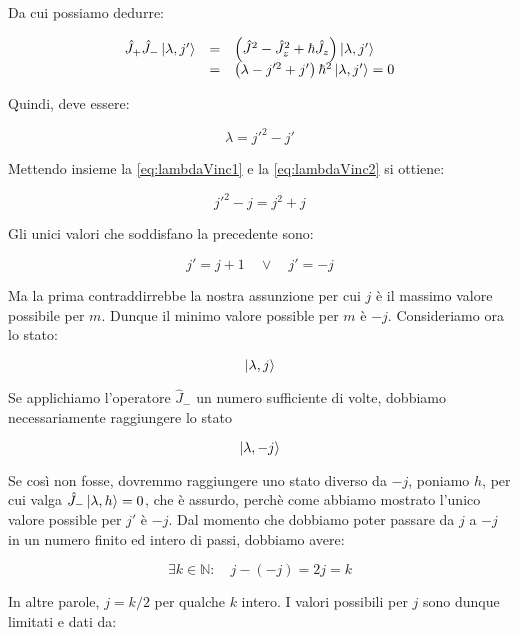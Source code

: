 Da cui possiamo dedurre:

	\begin{equation}
		\begin{array}{c c l}
			\hat{J}_+ \hat{J}_- \ket{\lambda, j'} & = & \left ( \hat{J}^2 - \hat{J}_z^2 + \hbar \hat{J}_z \right ) \ket{\lambda, j'}\\

		& = & \left ( \lambda - j'^2 + j' \right ) \hbar^2 \ket{\lambda, j'} = 0
		\end{array}
	\end{equation}

Quindi, deve essere:

	\begin{equation} \label{eq:lambdaVinc2}
		\lambda  = j'^2 - j'
	\end{equation}

Mettendo insieme la \eqref{eq:lambdaVinc1} e la \eqref{eq:lambdaVinc2} si ottiene:

	\begin{equation}
		j'^2 - j = j^2 + j
	\end {equation}

Gli unici valori che soddisfano la precedente sono:

	\[
		j' = j + 1 \quad \vee \quad j' = -j
	\]

Ma la prima contraddirrebbe la nostra assunzione per cui $j$ \`e il massimo valore possibile per $m$. Dunque il minimo valore possible per $m$ \`e $-j$. Consideriamo ora lo stato:

	\[
		\ket{\lambda, j}
	\]

Se applichiamo l'operatore $\hat{J}_-$ un numero sufficiente di volte, dobbiamo necessariamente raggiungere lo stato

	\[
		\ket{\lambda, -j}
	\]

Se cos\`i non fosse, dovremmo raggiungere uno stato diverso da $-j$, poniamo $h$, per cui valga $\hat{J}_- \ket{\lambda, h} = 0$, che \`e assurdo, perch\`e come abbiamo mostrato l'unico valore possible per $j'$ \`e $-j$. Dal momento che dobbiamo poter passare da $j$ a $-j$ in un numero finito ed intero di passi, dobbiamo avere:

	\begin{equation}
		\exists k \in \mathbb{N} : \quad j - (- j) = 2j = k
	\end{equation}

In altre parole, $j = k/2$ per qualche $k$ intero. I valori possibili per $j$ sono dunque limitati e dati da:

